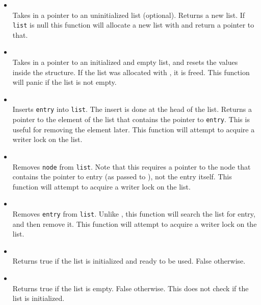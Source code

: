 \documentclass[a4paper]{article}
\begin{document}
\begin{itemize}
\item {} \\
Takes in a pointer to an uninitialized list (optional). Returns a new list. 
If \texttt{list} is null this function will allocate a new list with 
 and return a pointer to that.

\item {} \\
Takes in a pointer to an initialized and empty list, and resets the values
inside the structure. If the list was allocated with , it is freed.
This function will panic if the list is not empty. 
\item {} \\
Inserts \texttt{entry} into \texttt{list}. The insert is done at the head of the list. 
Returns a pointer to the element of the list that contains the pointer to \texttt{entry}.
This is useful for removing the element later. This function will attempt to acquire a writer lock
on the list.

\item {} \\
Removes \texttt{node} from \texttt{list}. Note that this requires a pointer to the node that contains
the pointer to entry (as passed to ), not the entry itself. This function will attempt to acquire 
a writer lock on the list.

\item {} \\
Removes \texttt{entry} from \texttt{list}. Unlike , this function will search the
list for entry, and then remove it. This function will attempt to acquire a writer lock on the list.

\item {} \\
Returns true if the list is initialized and ready to be used. False otherwise.

\item {} \\
Returns true if the list is empty. False otherwise. This does not check if the list is initialized.


\end{itemize}
\end{document}
